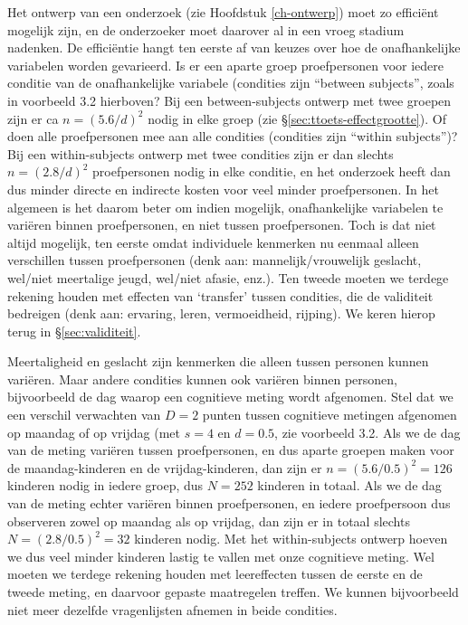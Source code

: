 \documentclass[
]{book}
\begin{document}
Het ontwerp van een onderzoek (zie
Hoofdstuk \ref{ch-ontwerp}) moet zo efficiënt mogelijk zijn, en de
onderzoeker moet daarover al in een vroeg stadium nadenken. De
efficiëntie hangt ten eerste af van keuzes over hoe de onafhankelijke
variabelen worden gevarieerd. Is er een aparte groep proefpersonen voor
iedere conditie van de onafhankelijke variabele (condities zijn ``between
subjects'', zoals in voorbeeld 3.2 hierboven? Bij een between-subjects
ontwerp met twee groepen zijn er ca \(n=(5.6/d)^2\) nodig in elke groep \citep{Gelm07}
(zie §\ref{sec:ttoets-effectgrootte}). Of doen alle proefpersonen mee
aan alle condities (condities zijn ``within subjects'')? Bij een
within-subjects ontwerp met twee condities zijn er dan slechts
\(n=(2.8/d)^2\) proefpersonen nodig in elke conditie, en het onderzoek
heeft dan dus minder directe en indirecte kosten voor veel minder
proefpersonen. In het algemeen is het daarom beter om indien mogelijk,
onafhankelijke variabelen te variëren binnen proefpersonen, en niet
tussen proefpersonen. Toch is dat niet altijd mogelijk, ten eerste omdat
individuele kenmerken nu eenmaal alleen verschillen tussen proefpersonen
(denk aan: mannelijk/vrouwelijk geslacht, wel/niet meertalige jeugd,
wel/niet afasie, enz.). Ten tweede moeten we terdege rekening houden met
effecten van `transfer' tussen condities, die de validiteit bedreigen
(denk aan: ervaring, leren, vermoeidheid, rijping). We keren hierop
terug in §\ref{sec:validiteit}.

Meertaligheid en geslacht zijn kenmerken die alleen tussen personen
kunnen variëren. Maar andere condities kunnen ook variëren binnen
personen, bijvoorbeeld de dag waarop een cognitieve meting wordt
afgenomen. Stel dat we een verschil verwachten van \(D=2\) punten tussen
cognitieve metingen afgenomen op maandag of op vrijdag (met \(s=4\) en
\(d=0.5\), zie voorbeeld 3.2. Als we de dag van de meting variëren
tussen proefpersonen, en dus aparte groepen maken voor de
maandag-kinderen en de vrijdag-kinderen, dan zijn er \(n=(5.6/0.5)^2=126\)
kinderen nodig in iedere groep, dus \(N=252\) kinderen in totaal. Als we
de dag van de meting echter variëren binnen proefpersonen, en iedere
proefpersoon dus observeren zowel op maandag als op vrijdag, dan zijn er in totaal
slechts \(N=(2.8/0.5)^2=32\) kinderen nodig. Met het
within-subjects ontwerp hoeven we dus veel minder kinderen lastig te
vallen met onze cognitieve meting. Wel moeten we terdege rekening houden
met leereffecten tussen de eerste en de tweede meting, en daarvoor
gepaste maatregelen treffen. We kunnen bijvoorbeeld niet meer dezelfde
vragenlijsten afnemen in beide condities.
\end{document}
